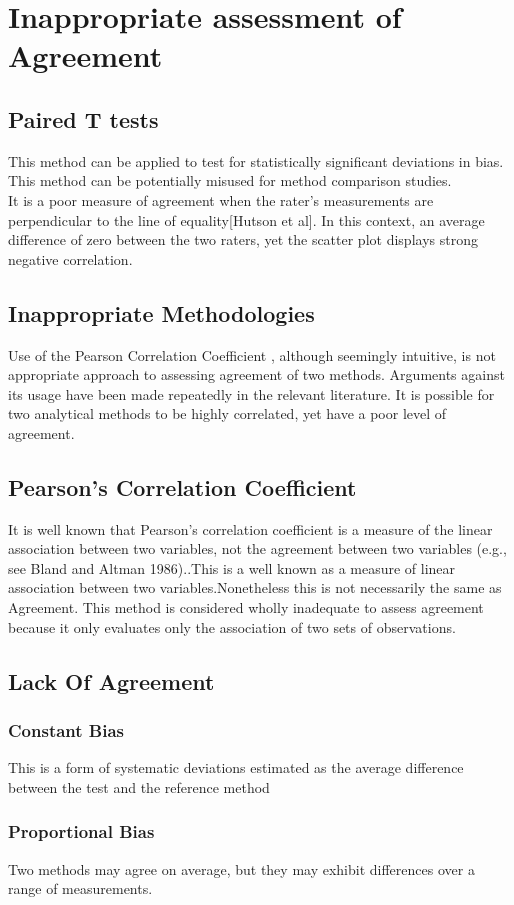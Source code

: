 \documentclass[12pt, a4paper]{report}
\begin{document}

\section{Inappropriate assessment of Agreement}
\subsection{Paired T tests} This method can be applied to test for
statistically significant deviations in bias. This method can be
potentially misused for method comparison studies.
\\It is a poor measure of agreement when the rater's measurements
are perpendicular to the line of equality[Hutson et al]. In this
context, an average difference of zero between the two raters, yet
the scatter plot displays strong negative correlation.
\subsection{Inappropriate Methodologies} Use of the Pearson
Correlation Coefficient , although seemingly intuitive, is not
appropriate approach to assessing agreement of two methods.
Arguments against its usage have been made repeatedly in the
relevant literature. It is possible for two analytical methods to
be highly correlated, yet have a poor level of agreement.
\subsection{Pearson's Correlation Coefficient} It is well known that
Pearson's correlation coefficient is a measure of the linear
 association between two variables, not the agreement between two
 variables (e.g., see Bland and Altman 1986)..This is a well known
as a measure of linear association between two
variables.Nonetheless this is not necessarily the same as
Agreement. This method is considered wholly inadequate to assess
agreement because it only evaluates only the association of two
sets of observations.

\newpage
\subsection{Lack Of Agreement}


\subsubsection*{Constant Bias} This is a form of systematic
deviations estimated as the average difference between the test
and the reference method


\subsubsection*{Proportional Bias} Two methods may agree on
average, but they may exhibit differences over a range of
measurements.






\end{document}
